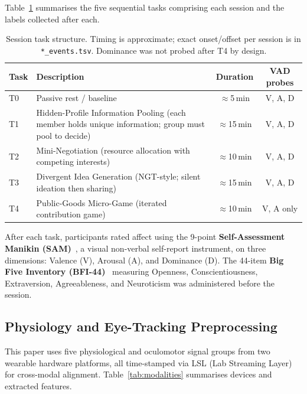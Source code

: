 \documentclass[sigconf,nonacm]{acmart}
\begin{document}
Table~\ref{tab:tasks} summarises the five sequential tasks comprising each
session and the labels collected after each.

\begin{table}[t]
\caption{Session task structure. Timing is approximate; exact onset/offset
per session is in \texttt{*\_events.tsv}. Dominance was not probed after T4
by design.}
\label{tab:tasks}
\centering
\setlength{\tabcolsep}{5pt}
\small
\begin{tabular}{lp{}cc}
\toprule
\textbf{Task} & \textbf{Description} & \textbf{Duration} & \textbf{VAD probes} \\
\midrule
T0 & Passive rest / baseline & $\approx$5\,min & V, A, D \\
T1 & Hidden-Profile Information Pooling
     (each member holds unique information; group must pool to decide) &
   $\approx$15\,min & V, A, D \\
T2 & Mini-Negotiation (resource allocation with competing interests) &
   $\approx$10\,min & V, A, D \\
T3 & Divergent Idea Generation (NGT-style; silent ideation then sharing) &
   $\approx$15\,min & V, A, D \\
T4 & Public-Goods Micro-Game (iterated contribution game) &
   $\approx$10\,min & V, A only \\
\bottomrule
\end{tabular}
\end{table}

After each task, participants rated affect using the 9-point
\textbf{Self-Assessment Manikin (SAM)}~\cite{bradley1994sam}, a visual
non-verbal self-report instrument, on three dimensions: Valence (V),
Arousal (A), and Dominance (D).
The 44-item \textbf{Big Five Inventory (BFI-44)}~\cite{john1999bigfive}
measuring Openness, Conscientiousness, Extraversion, Agreeableness, and
Neuroticism was administered before the session.

\subsection{Physiology and Eye-Tracking Preprocessing}
\label{sec:modpreproc}

This paper uses five physiological and oculomotor signal groups from two
wearable hardware platforms, all time-stamped via LSL (Lab Streaming Layer)
for cross-modal alignment.
Table~\ref{tab:modalities} summarises devices and extracted features.
\end{document}
